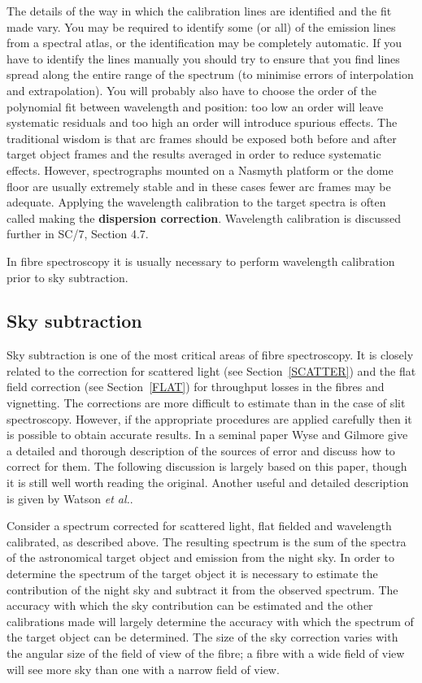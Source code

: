 \documentclass[twoside,11pt]{article}
\newcommand{\xref}[3]{#1}
\begin{document}
The details of the way in which the calibration lines are identified
and the fit made vary.  You may be required to identify some (or all)
of the emission lines from a spectral atlas, or the identification
may be completely automatic.  If you have to identify the lines
manually you should try to ensure that you find lines spread along
the entire range of the spectrum (to minimise errors of interpolation
and extrapolation).  You will probably also have to choose the order of
the polynomial fit between wavelength and position: too low an order
will leave systematic residuals and too high an order will introduce
spurious effects.  The traditional wisdom is that arc frames should be
exposed both before and after target object frames and the results averaged
in order to reduce systematic effects.  However, spectrographs mounted on
a Nasmyth platform or the dome floor are usually extremely stable and in
these cases fewer arc frames may be adequate.  Applying the wavelength
calibration to the target spectra is often called making the {\bf dispersion
correction}.  Wavelength calibration is discussed further in \xref{SC/7,
Section 4.7}{sc7}{wavelength_calibration}.

In fibre spectroscopy it is usually necessary to perform wavelength
calibration prior to sky subtraction.

\subsection{\label{SKYSUB}Sky subtraction}

Sky subtraction is one of the most critical areas of fibre spectroscopy.
It is closely related to the correction for scattered light (see
Section~\ref{SCATTER}) and the flat field correction (see Section~\ref{FLAT})
for throughput losses in the fibres and vignetting.  The corrections
are more difficult to estimate than in the case of slit spectroscopy.
However, if the appropriate procedures are applied carefully then it is
possible to obtain accurate results.  In a seminal paper Wyse and
Gilmore\cite{WYSE92} give a detailed and thorough description of the
sources of error and discuss how to correct for them.  The following
discussion is largely based on this paper, though it is still well
worth reading the original.  Another useful and detailed description
is given by Watson {\it et al.}\/\cite{WATSON98}.

Consider a spectrum corrected for scattered light, flat fielded and
wavelength calibrated, as described above.  The resulting spectrum is
the sum of the spectra of the astronomical target object and emission
from the night sky.  In order to determine the spectrum of the target
object it is necessary to estimate the contribution of the night sky and
subtract it from the observed spectrum.  The accuracy with which the sky
contribution can be estimated and the other calibrations made will largely
determine the accuracy with which the spectrum of the target object can be
determined.  The size of the sky correction varies with the angular size
of the field of view of the fibre; a fibre with a wide field of view will
see more sky than one with a narrow field of view.
\end{document}
